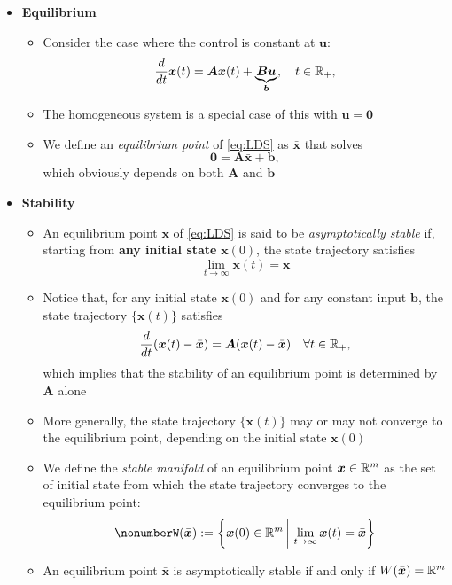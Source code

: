 \documentclass[12pt,a4paper]{article}
\begin{document}
\begin{itemize}
\item \textbf{Equilibrium}
  \begin{itemize}
  \item Consider the case where the control is constant at $\bm{u}$:
    \begin{equation}\label{eq:LDS}%
      \frac{d}{dt}\bm{x}(t) = \bm{A}\bm{x}(t) + \underbrace{\bm{B}\bm{u}}_{\bm{b}},
      \quad t\in \R_{+},
    \end{equation}
  \item The homogeneous system is a special case of this with $\bm{u}=\bm{0}$
  \item We define an \emph{equilibrium point} of \eqref{eq:LDS} as $\bar{\bm{x}}$ that solves
    \begin{equation}\nonumber%
      \bm{0} = \bm{A}\bar{\bm{x}} + \bm{b},
    \end{equation}
    which obviously depends on both $\bm{A}$ and $\bm{b}$
  \end{itemize}

\item \textbf{Stability}
  \begin{itemize}

  \item An equilibrium point $\bar{\bm{x}}$ of \eqref{eq:LDS}
    is said to be \emph{asymptotically stable} if,
    starting from \textbf{any initial state} $\bm{x}(0)$,
    the state trajectory satisfies
    \begin{equation}\nonumber%
      \lim_{t\to\infty}\bm{x}(t) = \bar{\bm{x}}
    \end{equation}
  \item Notice that, for any initial state $\bm{x}(0)$ and for any constant input $\bm{b}$,
    the state trajectory $\{\bm{x}(t)\}$ satisfies
    \begin{equation}\nonumber%
      \frac{d}{dt}(\bm{x}(t) - \bar{\bm{x}}) = \bm{A}(\bm{x}(t) - \bar{\bm{x}}) \quad \forall t\in \R_{+},
    \end{equation}
    which implies that the stability of an equilibrium point is determined by $\bm{A}$ alone
  \item More generally,
    the state trajectory $\{\bm{x}(t)\}$ may or may not converge to the equilibrium point,
    depending on the initial state $\bm{x}(0)$
    
  \item We define the \emph{stable manifold} of an equilibrium point $\bar{\bm{x}}\in \mathbb{R}^{m}$
    as the set of initial state from which the state trajectory converges to the equilibrium point:
    \begin{equation}\nonumber%
      W(\bar{\bm{x}}) := \left\{ \bm{x}(0)\in \R^{m} \,\bigg|\, \lim_{t\to \infty}\bm{x}(t) = \bar{\bm{x}} \right\}
    \end{equation}
  \item An equilibrium point $\bar{\bm{x}}$ is asymptotically stable
    if and only if $W(\bar{\bm{x}}) = \mathbb{R}^{m}$
  \end{itemize}

\end{itemize}
\end{document}

